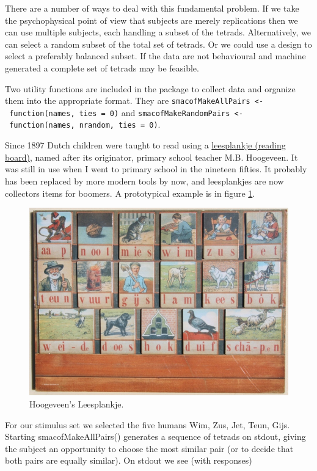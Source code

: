\documentclass[
  12pt,
]{article}
\begin{document}
There are a number of ways to deal with this fundamental problem. If we take the psychophysical point of view that subjects are merely replications then we
can use multiple subjects, each handling a subset of the tetrads.
Alternatively, we can select a random subset of the total set of tetrads.
Or we could use a design to select a preferably balanced subset. If the data are not behavioural and machine generated a complete set of tetrads may be
feasible.

Two utility functions are included in the package to collect data and organize them into the appropriate format. They are \texttt{smacofMakeAllPairs\ \textless{}-\ function(names,\ ties\ =\ 0)} and \texttt{smacofMakeRandomPairs\ \textless{}-\ function(names,\ nrandom,\ ties\ =\ 0)}.

Since 1897 Dutch children were taught to read using a
\href{https://nl.wikipedia.org/wiki/Leesplankje_van_Hoogeveen}{leesplankje (reading board)},
named after its originator, primary school teacher M.B. Hoogeveen.
It was still in use when I went to primary school in the nineteen
fifties. It probably has been replaced by more modern tools by now, and
leesplankjes are now collectors items for boomers. A prototypical example is in figure \ref{fig:hoogeveenjpg}.

\begin{figure}

{\centering \includegraphics[width=0.5\linewidth]{graphics/leesplankje} 

}

\caption{Hoogeveen's Leesplankje.}\label{fig:hoogeveenjpg}
\end{figure}

For our stimulus set we selected the five humans Wim, Zus, Jet, Teun, Gijs.
Starting smacofMakeAllPairs() generates a sequence of tetrads on stdout,
giving the subject an opportunity to choose the most similar pair (or to
decide that both pairs are equally similar). On stdout we see (with responses)
\end{document}
